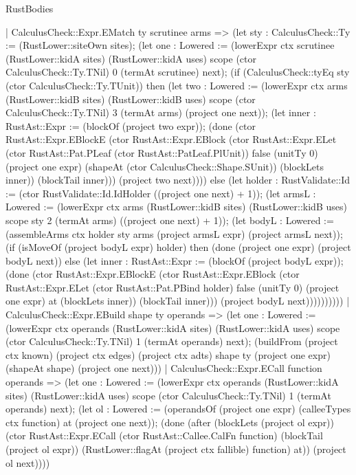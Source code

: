 \begin{lexlean}{RustBodies}
\begin{semanticmodule}
{    | CalculusCheck::Expr.EMatch ty scrutinee arms => (let sty : CalculusCheck::Ty := (RustLower::siteOwn sites); (let one : Lowered := (lowerExpr ctx scrutinee (RustLower::kidA sites) (RustLower::kidA uses) scope (ctor CalculusCheck::Ty.TNil) 0 (termAt scrutinee) next); (if (CalculusCheck::tyEq sty (ctor CalculusCheck::Ty.TUnit)) then (let two : Lowered := (lowerExpr ctx arms (RustLower::kidB sites) (RustLower::kidB uses) scope (ctor CalculusCheck::Ty.TNil) 3 (termAt arms) (project one next)); (let inner : RustAst::Expr := (blockOf (project two expr)); (done (ctor RustAst::Expr.EBlockE (ctor RustAst::Expr.EBlock (ctor RustAst::Expr.ELet (ctor RustAst::Pat.PLeaf (ctor RustAst::PatLeaf.PlUnit)) false (unitTy 0) (project one expr) (shapeAt (ctor CalculusCheck::Shape.SUnit)) (blockLets inner)) (blockTail inner))) (project two next)))) else (let holder : RustValidate::Id := (ctor RustValidate::Id.IdHolder ((project one next) + 1)); (let armsL : Lowered := (lowerExpr ctx arms (RustLower::kidB sites) (RustLower::kidB uses) scope sty 2 (termAt arms) ((project one next) + 1)); (let bodyL : Lowered := (assembleArms ctx holder sty arms (project armsL expr) (project armsL next)); (if (isMoveOf (project bodyL expr) holder) then (done (project one expr) (project bodyL next)) else (let inner : RustAst::Expr := (blockOf (project bodyL expr)); (done (ctor RustAst::Expr.EBlockE (ctor RustAst::Expr.EBlock (ctor RustAst::Expr.ELet (ctor RustAst::Pat.PBind holder) false (unitTy 0) (project one expr) at (blockLets inner)) (blockTail inner))) (project bodyL next))))))))))
    | CalculusCheck::Expr.EBuild shape ty operands => (let one : Lowered := (lowerExpr ctx operands (RustLower::kidA sites) (RustLower::kidA uses) scope (ctor CalculusCheck::Ty.TNil) 1 (termAt operands) next); (buildFrom (project ctx known) (project ctx edges) (project ctx adts) shape ty (project one expr) (shapeAt shape) (project one next)))
    | CalculusCheck::Expr.ECall function operands => (let one : Lowered := (lowerExpr ctx operands (RustLower::kidA sites) (RustLower::kidA uses) scope (ctor CalculusCheck::Ty.TNil) 1 (termAt operands) next); (let ol : Lowered := (operandsOf (project one expr) (calleeTypes ctx function) at (project one next)); (done (after (blockLets (project ol expr)) (ctor RustAst::Expr.ECall (ctor RustAst::Callee.CalFn function) (blockTail (project ol expr)) (RustLower::flagAt (project ctx fallible) function) at)) (project ol next))))
}
\end{semanticmodule}
\end{lexlean}

